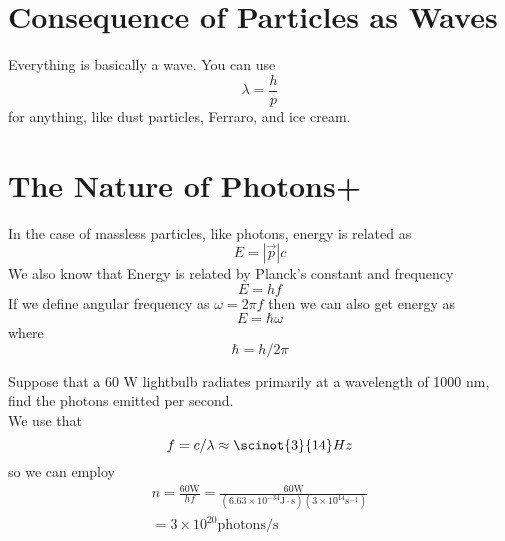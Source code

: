 \section{Consequence of Particles as Waves}
Everything is basically a wave. You can use 
\[ \lambda = \dfrac{h}{p} \]
for anything, like dust particles, Ferraro, and ice cream. 
\section{The Nature of Photons+}
In the case of massless particles, like photons, energy is related as
\[ E = |\vec{p}| c \] 
We also know that Energy is related by Planck's constant and frequency
\[ E = hf \]
If we define angular frequency as $ \omega = 2 \pi f $ then we can also get energy as
\[ E = \hbar \omega \]
where \[ \hbar = h/2 \pi \]
\begin{example}
	Suppose that a 60 W lightbulb radiates primarily at a wavelength of 1000 nm, find the photons emitted per second. \\
	We use that 
	\[ f = c/\lambda \approx \scinot{3}{14} Hz \]
	so we can employ
	\begin{align*}
	n = \frac { 60 \mathrm { W } } { h f } = \frac { 60 \mathrm { W } } { \left( 6.63 \times 10 ^ { - 34 } \mathrm { J } \cdot \mathrm { s } \right) \left( 3 \times 10 ^ { 14 } \mathrm { s } ^ { - 1 } \right) } \\
	= 3 \times 10 ^ { 20 } \mathrm { photons/s }
	\end{align*}
\end{example}
